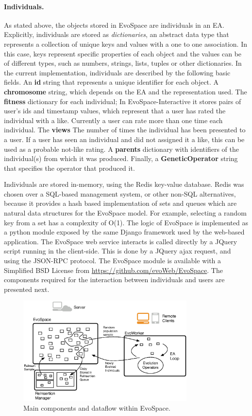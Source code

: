 \documentclass{sig-alternate}
\begin{document}
\paragraph{Individuals.}
As stated above, the objects stored in EvoSpace are individuals in an EA.
Explicitly, individuals are stored as \emph{dictionaries}, an abstract data type that represents a collection of unique keys and values with a one to one association. In this case, keys represent specific properties of each object and the values can be of different types, such as
numbers, strings, lists, tuples or other dictionaries.
In the current implementation, individuals are described by the following basic fields.
An \textbf{id} string that represents a unique identifier for each object.
A \textbf{chromosome} string, which depends on the EA and the representation used.
The \textbf{fitness} dictionary for each individual; In EvoSpace-Interactive it stores pairs of user's ids and timestamp values, which represent that a user has rated the individual with a like. Currently a user can rate more than one time each individual.
The \textbf{views} The number of times the individual has been presented to a user. If a user has seen an individual and  did not assigned it a like, this can be used as a probable not-like rating.
A \textbf{parents} dictionary with identifiers of the individual(s) from which it was produced.
Finally, a \textbf{GeneticOperator}  string that specifies the operator that produced it.


Individuals are stored in-memory, using the Redis key-value database. Redis was chosen over a SQL-based management system, or other non-SQL alternatives, because it provides a hash based implementation of sets and queues which are natural data structures for the EvoSpace model. For example, selecting a random key from a set has a complexity of O(1). The logic of EvoSpace is implemented as a python module exposed by the same Django framework used by the web-based application. The EvoSpace web service interacts is called directly by a JQuery script running in the client-side. This is done by a JQuery ajax request, and using the  JSON-RPC protocol.  The EvoSpace module is available with a Simplified BSD License from \url{https://github.com/evoWeb/EvoSpace}.  The components required for the interaction between individuals and users are presented next.

\begin{figure}[!t]
    \centering
        \includegraphics[width=3.5in]{evospaceExample.eps}
    \caption{Main components and dataflow within EvoSpace.}
    \label{fig:evo}
\end{figure}
\end{document}
